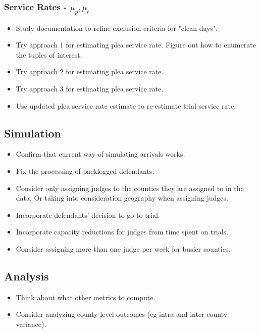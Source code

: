 \documentclass[11pt]{article}
\begin{document}
    \subsubsection{Service Rates - $\mu_p, \mu_t$}
      \begin{itemize}
        \item Study documentation to refine exclusion criteria for "clean days".
        \item Try approach 1 for estimating plea service rate. Figure out how to enumerate the tuples of interest.
        \item Try approach 2 for estimating plea service rate.
        \item Try approach 3 for estimating plea service rate.
        \item Use updated plea service rate estimate to re-estimate trial service rate.
      \end{itemize}

  \subsection{Simulation}
    \begin{itemize}
      \item Confirm that current way of simulating arrivals works.
      \item Fix the processing of backlogged defendants.
      \item Consider only assigning judges to the counties they are assigned to in the data. Or taking into consideration geography when assigning judges.
      \item Incorporate defendants' decision to go to trial.
      \item Incorporate capacity reductions for judges from time spent on trials.
      \item Consider assigning more than one judge per week for busier counties.
    \end{itemize}

  \subsection{Analysis}
    \begin{itemize}
      \item Think about what other metrics to compute.
      \item Consider analyzing county level outcomes (eg intra and inter county variance).
    \end{itemize}
\end{document}
